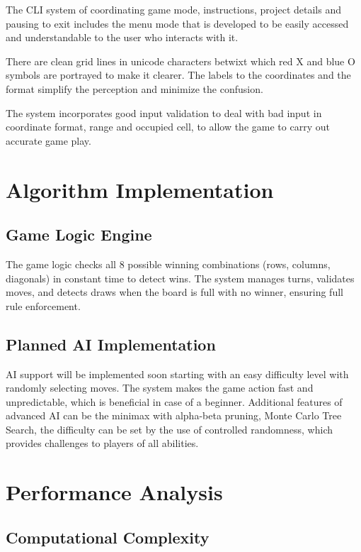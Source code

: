 \documentclass[11pt,a4paper,twocolumn]{article}
\begin{document}
The CLI system of coordinating game mode, instructions, project details and pausing to exit includes the menu mode that is developed to be easily accessed and understandable to the user who interacts with it.

There are clean grid lines in unicode characters betwixt which red X and blue O symbols are portrayed to make it clearer. The labels to the coordinates and the format simplify the perception and minimize the confusion.

The system incorporates good input validation to deal with bad input in coordinate format, range and occupied cell, to allow the game to carry out accurate game play.

\section{Algorithm Implementation}

\subsection{Game Logic Engine}

The game logic checks all 8 possible winning combinations (rows, columns, diagonals) in constant time to detect wins. The system manages turns, validates moves, and detects draws when the board is full with no winner, ensuring full rule enforcement.

\subsection{Planned AI Implementation}

AI support will be implemented soon starting with an easy difficulty level with randomly selecting moves. The system makes the game action fast and unpredictable, which is beneficial in case of a beginner. Additional features of advanced AI can be the minimax with alpha-beta pruning, Monte Carlo Tree Search, the difficulty can be set by the use of controlled randomness, which provides challenges to players of all abilities.

\section{Performance Analysis}

\subsection{Computational Complexity}
\end{document}
